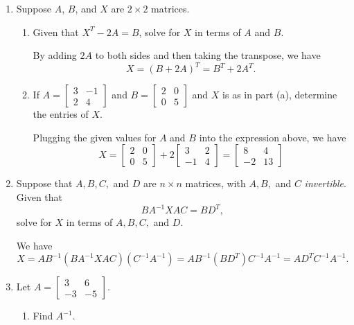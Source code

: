 \documentclass[12pt]{article}
\newcommand{\points}[1]{\marginpar{\hspace{24pt}[#1]}}
\begin{document}
\begin{enumerate}
\bigskip

\newpage

\item Suppose $A$, $B$, and $X$ are $2\times 2$ matrices.
\begin{enumerate}
\item Given that $X^T-2A=B$, solve for $X$ in terms of $A$ and $B$.\points{3}


\bigskip

 By adding $2A$ to both sides and then taking the transpose, we have
\[
 X = (B+2A)^T = B^T+2A^T.
\]


\bigskip


\item If $A=\begin{bmatrix}3&-1\\2&4\end{bmatrix}$ and $B=\begin{bmatrix}2&0\\0&5\end{bmatrix}$ and $X$ is as in part (a), determine the entries of $X$. \points{3}


\bigskip

 Plugging the given values for $A$ and $B$ into the expression above, we have
\[
 X = \begin{bmatrix}2&0\\0&5\end{bmatrix}+2\begin{bmatrix}3&2\\-1&4\end{bmatrix} = \begin{bmatrix}8&4\\-2&13\end{bmatrix}
\]


\bigskip


\end{enumerate}
\item Suppose that $A,B,C,$ and $D$ are $n\times n$ matrices, with $A,B,$ and $C$ {\em invertible}. Given that \points{4}
\[
BA^{-1}XAC=BD^T,
\]
solve for $X$ in terms of $A,B,C,$ and $D$.


\bigskip

 We have
\[
 X = AB^{-1}(BA^{-1}XAC)(C^{-1}A^{-1}) = AB^{-1}(BD^T)C^{-1}A^{-1} = AD^TC^{-1}A^{-1}.
\]


\bigskip

\newpage

\item Let $A=\begin{bmatrix}3&6\\-3&-5\end{bmatrix}$.
\begin{enumerate}
\item Find $A^{-1}$. \points{5}



\end{enumerate}
\end{enumerate}
\end{document}

